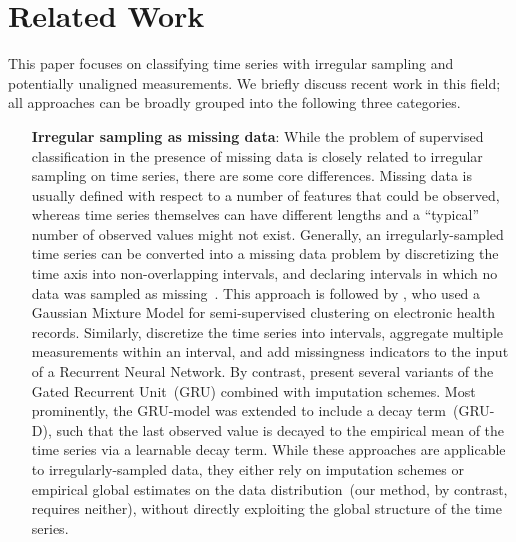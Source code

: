 \documentclass{article}
\begin{document}
\section{Related Work}


This paper focuses on classifying time series with irregular sampling
and potentially unaligned measurements. We briefly discuss recent
work in this field; all approaches can be broadly grouped into the
following three categories.

\begin{enumerate}[nosep, parsep=0.5em, labelindent=0em, itemsep=0em,
  align=left, labelwidth=*, leftmargin=0em]
\item[\textbf{Irregular sampling as missing data}:]
While the problem of supervised classification in the presence of missing data
is closely related to irregular sampling on time series, there are some core
differences. Missing data is usually defined with respect to a number of
features that could be observed, whereas time series themselves can have different
lengths and a ``typical'' number of observed values might not exist.
Generally, an irregularly-sampled time series can be converted into a
missing data problem by discretizing the time axis into non-overlapping
intervals, and declaring intervals in which no data was sampled as
missing~\citep{Bahadori19}.
This approach is followed by \citet{marlin2012unsupervised}, who used a Gaussian
Mixture Model for semi-supervised clustering on electronic health
records.
Similarly, \citet{lipton2016directly} discretize the time series into
intervals, aggregate multiple measurements within an interval, and add
missingness indicators to the input of a Recurrent Neural Network.
By contrast, \citet{che2018recurrent} present several variants of the Gated
Recurrent Unit~(GRU) combined with imputation schemes. Most prominently, the
GRU-model was extended to include a decay term~(GRU-D), such that the last
observed value is decayed to the empirical mean of the time series via a
learnable decay term. While these approaches are applicable to
irregularly-sampled data, they either rely on imputation schemes or
empirical global estimates on the data distribution~(our method, by
contrast, requires neither), without directly
exploiting the global structure of the time series.


\end{enumerate}
\end{document}
